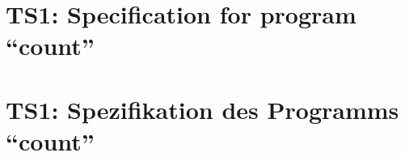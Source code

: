 \parindent0pt

\thispagestyle{empty}
\ifenglish
\section*{TS1: Specification for program ``count''}

\fi
\ifgerman
\section*{TS1: Spezifikation des Programms ``count''}

\fi

